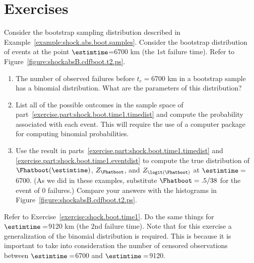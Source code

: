 \section*{Exercises}

\begin{exercise1}
\label{exercise:shock.boot.time1}
Consider the bootstrap sampling distribution described in
Example~\ref{example:shock.abs.boot.samples}. Consider the bootstrap
distribution of events at the point $\estimtime$=6700 km (the $1$st
failure time). Refer to Figure~\ref{figure:shockabsB.cdfboot.t2.ps}.
\begin{enumerate}
\item
\label{exercise.part:shock.boot.time1.timedist}
The number of observed failures before $t_{e}=$6700 km
in a bootstrap sample has a
binomial distribution. What are the parameters of this distribution?
\item
\label{exercise.part:shock.boot.time1.eventdist}
List all of the possible outcomes in the sample space of
part~\ref{exercise.part:shock.boot.time1.timedist} and compute the
probability associated with each event.  This will require the use of
a computer package for computing binomial probabilities.
\item
Use the result in
parts~\ref{exercise.part:shock.boot.time1.timedist} 
and \ref{exercise.part:shock.boot.time1.eventdist} to
compute the true distribution of $\Fhatboot(\estimtime)$,
$Z_{\Fhatboot}$, and $Z_{\logit(\Fhatboot)}$ at $\estimtime=$6700.
(As we did in these examples, substitute $\Fhatboot=.5/38$
for the event of 0 failures.)
Compare your answers with the histograms in
Figure~\ref{figure:shockabsB.cdfboot.t2.ps}.
\end{enumerate}
\end{exercise1}


\begin{exercise1}
\label{exercise:shock.boot.time2}
Refer to Exercise~\ref{exercise:shock.boot.time1}.  Do the same things
for $\estimtime=$9120 km (the $2$nd failure time).  Note that 
for this exercise a generalization of the binomial distribution is
required. This is because it is important
to take into consideration the number of censored observations between
$\estimtime=$6700 and $\estimtime=$9120.
\end{exercise1}


